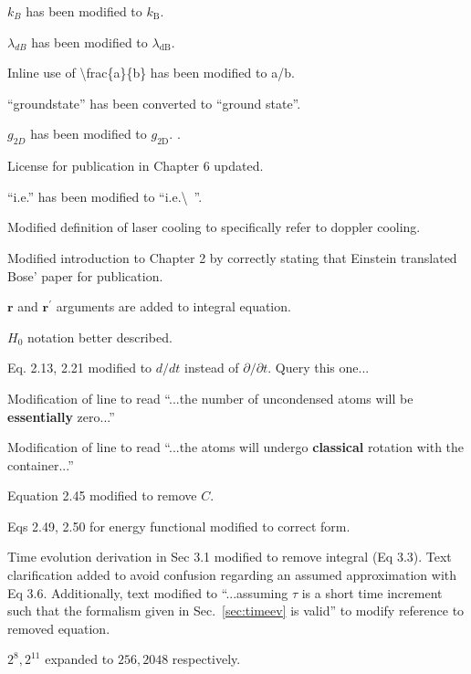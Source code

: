 \documentclass[paper=a4, fontsize=12pt]{scrartcl}
\begin{document}
\begin{description}[align=left]
    \item [Throughout] $k_B$ has been modified to $k_\textrm{B}$.
    \item [Throughout] $\lambda_{dB}$ has been modified to $\lambda_\textrm{dB}$.
    \item [Throughout] Inline use of
\textbackslash frac\{a\}\{b\} has been modified to a/b.
    \item [Throughout] ``groundstate'' has been converted to ``ground state''.
    \item [Throughout] $g_{2D}$ has been modified to $g_\textrm{2D}$.
.
    \item [P iv] License for publication in Chapter 6 updated.
    \item [Throughout] ``i.e.'' has been modified to ``i.e.\textbackslash \ ''.
    \item [P6] Modified definition of laser cooling to specifically refer to doppler cooling.
    \item [P7] Modified introduction to Chapter 2 by correctly stating that Einstein translated Bose' paper for publication.
    \item [P10] $\mathbf{r}$ and $\mathbf{r}^{\prime}$ arguments are added to integral equation.
    \item [P10] $H_0$ notation better described.
    \item [P11,12] Eq. 2.13, 2.21 modified to $d/dt$ instead of $\partial / \partial t$. Query this one...
    \item [P12] Modification of line to read ``...the number of uncondensed atoms will be \textbf{essentially} zero...''
    \item [P17] Modification of line to read ``...the atoms will undergo \textbf{classical} rotation with the container...''
    \item [P20] Equation 2.45 modified to remove $C$.
    \item [P21] Eqs 2.49, 2.50 for energy functional modified to correct form.
    \item [P28] Time evolution derivation in Sec 3.1 modified to remove integral (Eq 3.3). Text clarification added to avoid confusion regarding an assumed approximation with Eq 3.6. Additionally, text modified to ``...assuming $\tau$ is a short time increment such that the formalism given in Sec.~\ref{sec:timeev} is valid'' to modify reference to removed equation.
    \item [P34] $2^8, 2^{11}$ expanded to $256,2048$ respectively.

\end{description}
\end{document}

